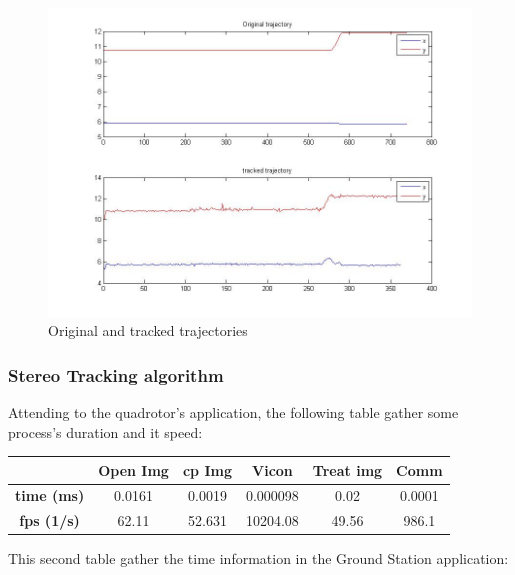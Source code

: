 	\begin{figure}[ph]
		\centering
		\includegraphics[width=0.7\linewidth]{../Images/c4/arch_trajs}
		\caption{Original and tracked trajectories}
		\label{fig:arch_trajs}
	\end{figure}

	
	\subsubsection{Stereo Tracking algorithm}
		Attending to the quadrotor's application, the following table gather some process's duration and it speed:
		\newline
		\newline
		{
		\centering
			\begin{tabular}{|c|c|c|c|c|c|}
			\hline  					&  Open Img	&  cp Img 	& Vicon 	& Treat img & Comm  		\\ 
			\hline  \textbf{time (ms)}	& 	0.0161	& 0.0019	&	0.000098&  	 0.02	&	0.0001		\\ 
			\hline  \textbf{fps (1/s)}	&  	62.11	&  52.631	& 10204.08 	&  49.56	&	986.1	\\ 
			\hline 
			\end{tabular} 
		}
		\newline
		
		This second table gather the time information in the Ground Station application:
		\newline
		
